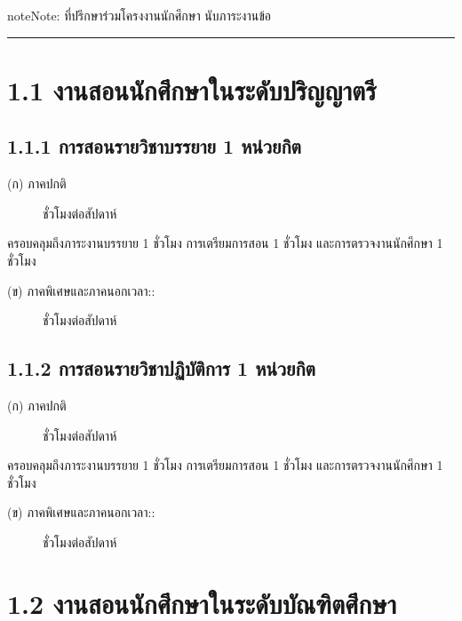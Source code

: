 \documentclass[a4paper,12pt,english]{sphinxmanual}
\begin{document}
\begin{sphinxadmonition}{note}{Note:}
ที่ปรึกษาร่วมโครงงานนักศึกษา นับภาระงานข้อ  
\end{sphinxadmonition}


\bigskip\hrule\bigskip



\section{1.1 งานสอนนักศึกษาในระดับปริญญาตรี}
\label{\detokenize{1teaching:id4}}

\subsection{1.1.1 การสอนรายวิชาบรรยาย 1 หน่วยกิต}
\label{\detokenize{1teaching:id5}}\begin{description}
\item[{(ก) ภาคปกติ}]  ชั่วโมงต่อสัปดาห์

\end{description}

ครอบคลุมถึงภาระงานบรรยาย 1 ชั่วโมง การเตรียมการสอน 1 ชั่วโมง และการตรวจงานนักศึกษา 1 ชั่วโมง
\begin{description}
\item[{(ข) ภาคพิเศษและภาคนอกเวลา::}]  ชั่วโมงต่อสัปดาห์

\end{description}


\subsection{1.1.2 การสอนรายวิชาปฏิบัติการ 1 หน่วยกิต}
\label{\detokenize{1teaching:id6}}\begin{description}
\item[{(ก) ภาคปกติ}]  ชั่วโมงต่อสัปดาห์

\end{description}

ครอบคลุมถึงภาระงานบรรยาย 1 ชั่วโมง การเตรียมการสอน 1 ชั่วโมง และการตรวจงานนักศึกษา 1 ชั่วโมง
\begin{description}
\item[{(ข) ภาคพิเศษและภาคนอกเวลา::}]  ชั่วโมงต่อสัปดาห์

\end{description}


\section{1.2 งานสอนนักศึกษาในระดับบัณฑิตศึกษา}
\label{\detokenize{1teaching:id7}}
\end{document}
